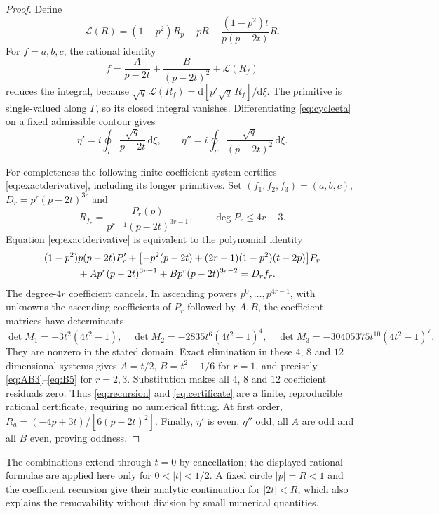 \documentclass[10pt]{article}
\newcommand{\dd}{\mathrm d}
\begin{document}
\begin{proof}
Define
\[
 \mathcal L(R)=(1-p^2)R_p-pR+\frac{(1-p^2)t}{p(p-2t)}R.
\]
For $f=a,b,c$, the rational identity
\begin{equation}
 f=\frac A{p-2t}+\frac B{(p-2t)^2}+\mathcal L(R_f)
 \label{eq:exactderivative}
\end{equation}
reduces the integral, because
$\sqrt q\,\mathcal L(R_f)=\dd[p'\sqrt q\,R_f]/\dd\xi$.
The primitive is single-valued along $\Gamma$, so its closed integral vanishes. Differentiating \eqref{eq:cycleeta} on a fixed admissible contour gives
\[
 \eta'=i\oint_\Gamma\frac{\sqrt q}{p-2t}\,\dd\xi,
 \qquad
 \eta''=i\oint_\Gamma\frac{\sqrt q}{(p-2t)^2}\,\dd\xi.
\]

For completeness the following finite coefficient system certifies \eqref{eq:exactderivative}, including its longer primitives. Set $(f_1,f_2,f_3)=(a,b,c)$, $D_r=p^r(p-2t)^{3r}$ and
\[
 R_{f_r}=\frac{P_r(p)}{p^{r-1}(p-2t)^{3r-1}},\qquad \deg P_r\le4r-3.
\]
Equation \eqref{eq:exactderivative} is equivalent to the polynomial identity
\begin{align}
 &(1-p^2)p(p-2t)P_r'
 +\bigl[-p^2(p-2t)+(2r-1)(1-p^2)(t-2p)\bigr]P_r\nonumber\\
 &\hspace{12mm}+A p^r(p-2t)^{3r-1}+B p^r(p-2t)^{3r-2}=D_r f_r.
 \label{eq:certificate}
\end{align}
The degree-$4r$ coefficient cancels. In ascending powers $p^0,\ldots,p^{4r-1}$, with unknowns the ascending coefficients of $P_r$ followed by $A,B$, the coefficient matrices have determinants
\begin{equation}
 \det M_1=-3t^2(4t^2-1),\quad
 \det M_2=-2835t^6(4t^2-1)^4,\quad
 \det M_3=-30405375t^{10}(4t^2-1)^7.
 \label{eq:det}
\end{equation}
They are nonzero in the stated domain. Exact elimination in these $4$, $8$ and $12$ dimensional systems gives $A=t/2$, $B=t^2-1/6$ for $r=1$, and precisely \eqref{eq:AB3}--\eqref{eq:B5} for $r=2,3$. Substitution makes all $4$, $8$ and $12$ coefficient residuals zero. Thus \eqref{eq:recursion} and \eqref{eq:certificate} are a finite, reproducible rational certificate, requiring no numerical fitting. At first order, $R_a=(-4p+3t)/[6(p-2t)^2]$. Finally, $\eta'$ is even, $\eta''$ odd, all $A$ are odd and all $B$ even, proving oddness.
\end{proof}

The combinations extend through $t=0$ by cancellation; the displayed rational formulae are applied here only for $0<|t|<1/2$. A fixed circle $|p|=R<1$ and the coefficient recursion give their analytic continuation for $|2t|<R$, which also explains the removability without division by small numerical quantities.
\end{document}
